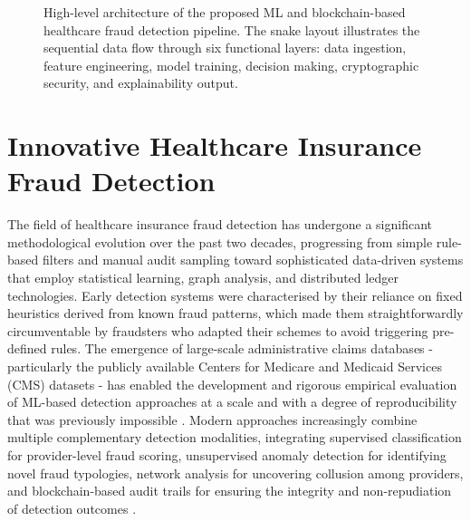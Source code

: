 \begin{figure}[H]
\caption{High-level architecture of the proposed ML and blockchain-based healthcare fraud detection pipeline. The snake layout illustrates the sequential data flow through six functional layers: data ingestion, feature engineering, model training, decision making, cryptographic security, and explainability output.}
\label{fig:ml_blockchain_arch}
\end{figure}

\section{Innovative Healthcare Insurance Fraud Detection}

The field of healthcare insurance fraud detection has undergone a significant methodological evolution over the past two decades, progressing from simple rule-based filters and manual audit sampling toward sophisticated data-driven systems that employ statistical learning, graph analysis, and distributed ledger technologies. Early detection systems were characterised by their reliance on fixed heuristics derived from known fraud patterns, which made them straightforwardly circumventable by fraudsters who adapted their schemes to avoid triggering pre-defined rules. The emergence of large-scale administrative claims databases - particularly the publicly available Centers for Medicare and Medicaid Services (CMS) datasets - has enabled the development and rigorous empirical evaluation of ML-based detection approaches at a scale and with a degree of reproducibility that was previously impossible \cite{ahmadian2020}. Modern approaches increasingly combine multiple complementary detection modalities, integrating supervised classification for provider-level fraud scoring, unsupervised anomaly detection for identifying novel fraud typologies, network analysis for uncovering collusion among providers, and blockchain-based audit trails for ensuring the integrity and non-repudiation of detection outcomes \cite{hassan2019}.

